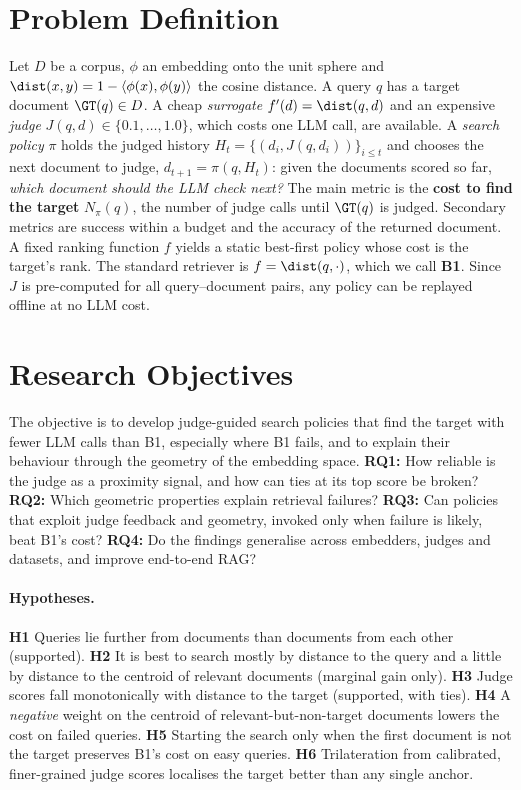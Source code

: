 
\section{Problem Definition}
\label{sec:problem}

Let $D$ be a corpus, $\phi$ an embedding onto the unit sphere and $\dist(x,y)=1-\langle\phi(x),\phi(y)\rangle$ the cosine distance. A query $q$ has a target document $\GT(q)\in D$. A cheap \emph{surrogate} $f'(d)=\dist(q,d)$ and an expensive \emph{judge} $J(q,d)\in\{0.1,\dots,1.0\}$, which costs one LLM call, are available. A \emph{search policy} $\pi$ holds the judged history $H_t=\{(d_i,J(q,d_i))\}_{i\le t}$ and chooses the next document to judge, $d_{t+1}=\pi(q,H_t)$: given the documents scored so far, \emph{which document should the LLM check next?} The main metric is the \textbf{cost to find the target} $N_\pi(q)$, the number of judge calls until $\GT(q)$ is judged. Secondary metrics are success within a budget and the accuracy of the returned document. A fixed ranking function $f$ yields a static best-first policy whose cost is the target's rank. The standard retriever is $f=\dist(q,\cdot)$, which we call \textbf{B1}. Since $J$ is pre-computed for all query--document pairs, any policy can be replayed offline at no LLM cost.

\section{Research Objectives}

The objective is to develop judge-guided search policies that find the target with fewer LLM calls than B1, especially where B1 fails, and to explain their behaviour through the geometry of the embedding space. \textbf{RQ1:} How reliable is the judge as a proximity signal, and how can ties at its top score be broken? \textbf{RQ2:} Which geometric properties explain retrieval failures? \textbf{RQ3:} Can policies that exploit judge feedback and geometry, invoked only when failure is likely, beat B1's cost? \textbf{RQ4:} Do the findings generalise across embedders, judges and datasets, and improve end-to-end RAG?

\paragraph{Hypotheses.}
\textbf{H1} Queries lie further from documents than documents from each other (supported). \textbf{H2} It is best to search mostly by distance to the query and a little by distance to the centroid of relevant documents (marginal gain only). \textbf{H3} Judge scores fall monotonically with distance to the target (supported, with ties). \textbf{H4} A \emph{negative} weight on the centroid of relevant-but-non-target documents lowers the cost on failed queries. \textbf{H5} Starting the search only when the first document is not the target preserves B1's cost on easy queries. \textbf{H6} Trilateration from calibrated, finer-grained judge scores localises the target better than any single anchor.
